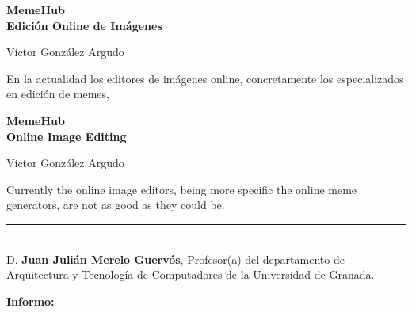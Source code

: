 \thispagestyle{empty}

\begin{center}
{\large\bfseries MemeHub \\ Edición Online de Imágenes }\\
\end{center}
\begin{center}
Víctor González Argudo\\
\end{center}


\vspace{0.5cm}
\vspace{0.7cm}

	En la actualidad los editores de imágenes online, concretamente los especializados en
	edición de memes, 

\cleardoublepage

\begin{center}
	{\large\bfseries MemeHub \\ Online Image Editing}\\
\end{center}
\begin{center}
	Víctor González Argudo\\
\end{center}
\vspace{0.5cm}
\vspace{0.7cm}

	Currently the online image editors, being more specific the online meme generators, are
	not as good as they could be. 


\cleardoublepage

\thispagestyle{empty}

\noindent\rule[-1ex]{\textwidth}{2pt}\\[4.5ex]

D. \textbf{Juan Julián Merelo Guervós}, Profesor(a) del departamento de Arquitectura y Tecnología de 
Computadores de la Universidad de Granada.

\vspace{0.5cm}

\textbf{Informo:}

